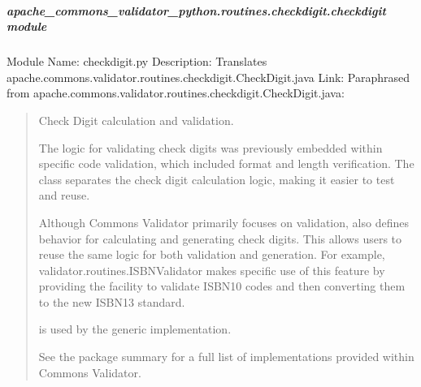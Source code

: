 \documentclass[letterpaper,10pt,english]{sphinxmanual}
\begin{document}
\subparagraph{apache\_commons\_validator\_python.routines.checkdigit.checkdigit module}
\label{\detokenize{apache_commons_validator_python.routines.checkdigit:module-apache_commons_validator_python.routines.checkdigit.checkdigit}}\label{\detokenize{apache_commons_validator_python.routines.checkdigit:apache-commons-validator-python-routines-checkdigit-checkdigit-module}}
\sphinxAtStartPar
Module Name: checkdigit.py
Description: Translates apache.commons.validator.routines.checkdigit.CheckDigit.java
Link: 
Paraphrased from apache.commons.validator.routines.checkdigit.CheckDigit.java:
\begin{quote}

\sphinxAtStartPar
Check Digit calculation and validation.

\sphinxAtStartPar
The logic for validating check digits was previously embedded within specific
code validation, which included format and length verification. The 
class separates the check digit calculation logic, making it easier to test and reuse.

\sphinxAtStartPar
Although Commons Validator primarily focuses on validation,  also defines
behavior for calculating and generating check digits. This allows users to reuse the same
logic for both validation and generation. For example, validator.routines.ISBNValidator
makes specific use of this feature by providing the facility to validate
ISBN\sphinxhyphen{}10 codes and then converting them to the new ISBN\sphinxhyphen{}13 standard.

\sphinxAtStartPar
{} is used by the generic  implementation.
\begin{description}
\sphinxAtStartPar
See the package summary for a full list of implementations provided within Commons Validator.

\end{description}
\end{quote}
\end{document}
